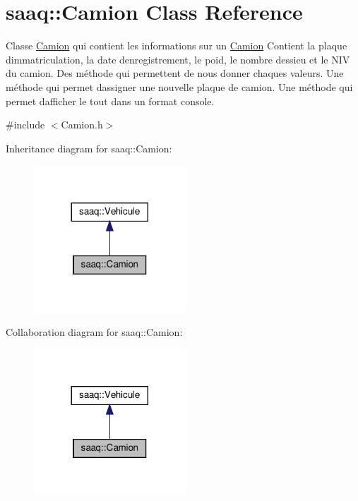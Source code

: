 \hypertarget{classsaaq_1_1Camion}{}\section{saaq\+:\+:Camion Class Reference}
\label{classsaaq_1_1Camion}


Classe \hyperlink{classsaaq_1_1Camion}{Camion} qui contient les informations sur un \hyperlink{classsaaq_1_1Camion}{Camion} Contient la plaque d\textquotesingle{}immatriculation, la date d\textquotesingle{}enregistrement, le poid, le nombre d\textquotesingle{}essieu et le N\+IV du camion. Des méthode qui permettent de nous donner chaques valeurs. Une méthode qui permet d\textquotesingle{}assigner une nouvelle plaque de camion. Une méthode qui permet d\textquotesingle{}afficher le tout dans un format console.  




{\ttfamily \#include $<$Camion.\+h$>$}



Inheritance diagram for saaq\+:\+:Camion\+:\nopagebreak
\begin{figure}[H]
\begin{center}
\leavevmode
\includegraphics[width=161pt]{classsaaq_1_1Camion__inherit__graph}
\end{center}
\end{figure}


Collaboration diagram for saaq\+:\+:Camion\+:\nopagebreak
\begin{figure}[H]
\begin{center}
\leavevmode
\includegraphics[width=161pt]{classsaaq_1_1Camion__coll__graph}
\end{center}
\end{figure}
